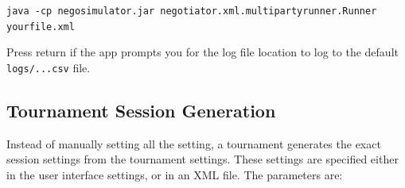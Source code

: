 \documentclass[]{article}
\begin{document}
\vspace{0.5cm}
\verb|java -cp negosimulator.jar negotiator.xml.multipartyrunner.Runner yourfile.xml|
\vspace{0.5cm}

Press return if the app prompts you for the log file location to log to  the default \verb|logs/...csv| file.

\subsection{Tournament Session Generation}\label{sec:sessiongeneration}
Instead of manually setting all the setting, a tournament generates the exact session settings from the tournament settings. These
settings are specified either in the user interface settings, or in an XML file. The parameters are:
\end{document}
